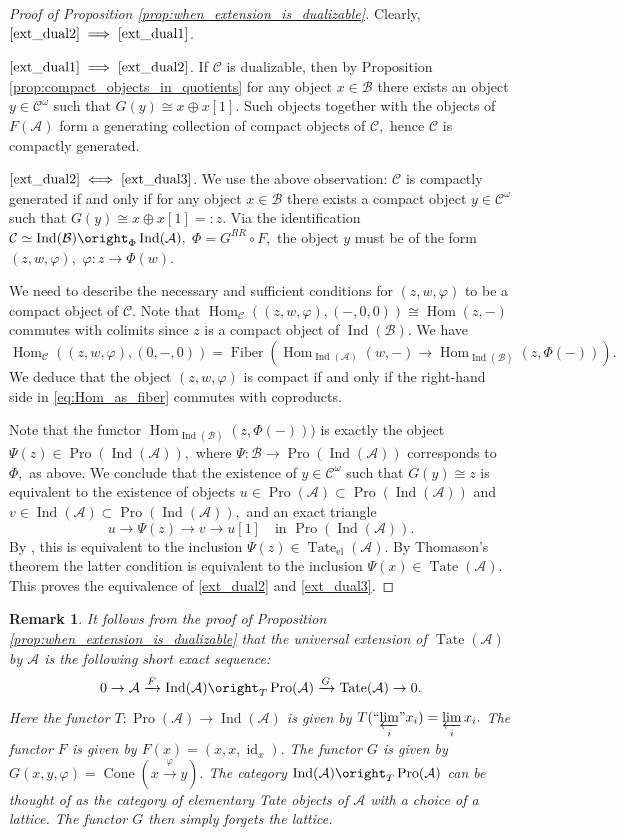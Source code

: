 \documentclass[11pt,leqno]{amsart}
\newcommand{\Implies}[2]{$\text{\ref{#1}}\implies\text{\ref{#2}}$}
\newcommand{\Iff}[2]{$\text{\ref{#1}}\iff\text{\ref{#2}}$}
\newtheorem{remark}[theo]{Remark}
\numberwithin{equation}{section}
\def\Hom{\operatorname{Hom}}
\newcommand{\prolim}[1][]{\mathop{\varprojlim}\limits_{#1}}
\newcommand{\proolim}[1][]{{``{\prolim[#1]}"}}
\newcommand{\xto}{\xrightarrow}
\newcommand{\Tate}{\operatorname{Tate}}
\newcommand{\Cone}{\operatorname{Cone}}
\newcommand{\Fiber}{\operatorname{Fiber}}
\newcommand{\el}{\operatorname{el}}
\newcommand{\cA}{{\mathcal A}}
\newcommand{\cB}{{\mathcal B}}
\newcommand{\cC}{{\mathcal C}}
\newcommand{\Ind}{\operatorname{Ind}}
\newcommand{\Pro}{\operatorname{Pro}}
\newcommand{\id}{\operatorname{id}}
\begin{document}
\begin{proof}[Proof of Proposition \ref{prop:when_extension_is_dualizable}] Clearly, \Implies{ext_dual2}{ext_dual1}. 

\Implies{ext_dual1}{ext_dual2}. If $\cC$ is dualizable, then by Proposition \ref{prop:compact_objects_in_quotients} for any object $x\in\cB$ there exists an object $y\in\cC^{\omega}$ such that $G(y)\cong x\oplus x[1]$. Such objects together with the objects of $F(\cA)$ form a generating collection of compact objects of $\cC,$ hence $\cC$ is compactly generated.

\Iff{ext_dual2}{ext_dual3}. We use the above observation: $\cC$ is compactly generated if and only if for any object $x\in \cB$ there exists a compact object $y\in\cC^{\omega}$ such that $G(y)\cong x\oplus x[1]=:z.$ Via the identification $\cC\simeq\Ind(\cB)\oright_{\Phi}\Ind(\cA),$ $\Phi=G^{RR}\circ F,$ the object $y$ must be of the form $(z,w,\varphi),$ $\varphi:z\to\Phi(w).$

We need to describe the necessary and sufficient conditions for $(z,w,\varphi)$ to be a compact object of $\cC.$ Note that $\Hom_{\cC}((z,w,\varphi),(-,0,0))\cong\Hom(z,-)$ commutes with colimits since $z$ is a compact object of $\Ind(\cB).$ We have
\begin{equation}\label{eq:Hom_as_fiber} \Hom_{\cC}((z,w,\varphi),(0,-,0))=\Fiber(\Hom_{\Ind(\cA)}(w,-)\to \Hom_{\Ind(\cB)}(z,\Phi(-))).\end{equation}
We deduce that the object $(z,w,\varphi)$ is compact if and only if the right-hand side in \eqref{eq:Hom_as_fiber} commutes with coproducts.

Note that the functor $\Hom_{\Ind(\cB)}(z,\Phi(-)))$ is exactly the object $\Psi(z)\in\Pro(\Ind(\cA)),$ where $\Psi:\cB\to\Pro(\Ind(\cA))$ corresponds to $\Phi,$ as above. We conclude that the existence of $y\in\cC^{\omega}$ such that $G(y)\cong z$ is equivalent to the existence of objects $u\in\Pro(\cA)\subset\Pro(\Ind(\cA))$ and $v\in\Ind(\cA)\subset\Pro(\Ind(\cA)),$ and an exact triangle $$u\to\Psi(z)\to v\to u[1]\quad \text{in }\Pro(\Ind(\cA)).$$
By \cite[Theorem 3]{Hen}, this is equivalent to the inclusion $\Psi(z)\in\Tate_{\el}(\cA).$ By Thomason's theorem the latter condition is equivalent to the inclusion $\Psi(x)\in\Tate(\cA).$  This proves the equivalence of \ref{ext_dual2} and \ref{ext_dual3}.
\end{proof}

\begin{remark}It follows from the proof of Proposition \ref{prop:when_extension_is_dualizable} that the universal extension of $\Tate(\cA)$ by $\cA$ is the following short exact sequence:
$$0\to\cA\xto{F}\Ind(\cA)\oright_{T}\Pro(\cA)\xto{G}\Tate(\cA)\to 0.$$
Here the functor $T:\Pro(\cA)\to\Ind(\cA)$ is given by $T(\proolim[i]x_i)=\prolim[i] x_i.$ The functor $F$ is given by $F(x)=(x,x,\id_x).$ The functor $G$ is given by $G(x,y,\varphi)=\Cone(x\xto{\varphi} y).$ The category $\Ind(\cA)\oright_{T}\Pro(\cA)$ can be thought of as the category of elementary Tate objects of $\cA$ with a choice of a lattice. The functor $G$ then simply forgets the lattice.\end{remark}
\end{document}
